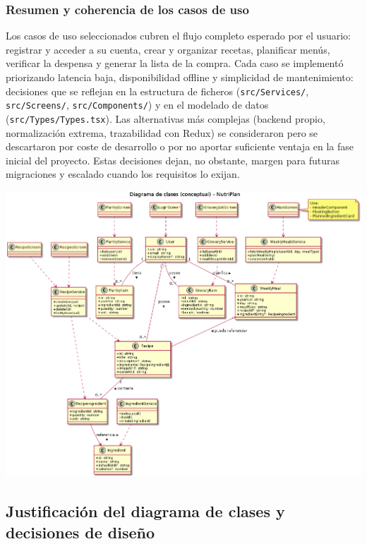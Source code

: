 \documentclass[twoside, openright, 11pt]{report}
\begin{document}
		\subsubsection*{Resumen y coherencia de los casos de uso}
		Los casos de uso seleccionados cubren el flujo completo esperado por el usuario: registrar y acceder a su cuenta, crear y organizar recetas, planificar menús, verificar la despensa y generar la lista de la compra. Cada caso se implementó priorizando latencia baja, disponibilidad offline y simplicidad de mantenimiento: decisiones que se reflejan en la estructura de ficheros (\texttt{src/Services/}, \texttt{src/Screens/}, \texttt{src/Components/}) y en el modelado de datos (\texttt{src/Types/Types.tsx}). Las alternativas más complejas (backend propio, normalización extrema, trazabilidad con Redux) se consideraron pero se descartaron por coste de desarrollo o por no aportar suficiente ventaja en la fase inicial del proyecto. Estas decisiones dejan, no obstante, margen para futuras migraciones y escalado cuando los requisitos lo exijan.

		
		\clearpage
		\thispagestyle{empty}
		\noindent
		\includegraphics[width=\paperwidth,height=\paperheight,keepaspectratio]{imagenes/class_diagram}
		\clearpage
		\restoregeometry
		
		
		
		\subsection{Justificación del diagrama de clases y decisiones de diseño}
		\label{sec:justificacion_diagrama}
		
\end{document}
